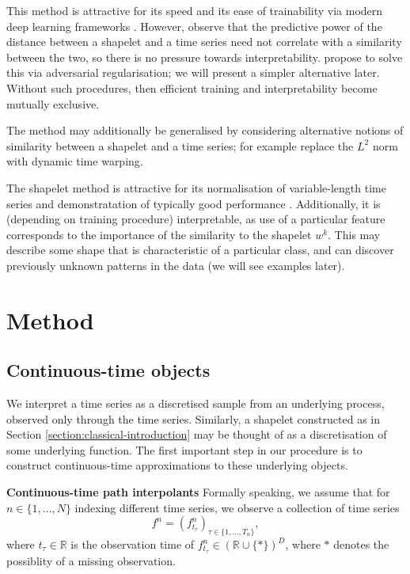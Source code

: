 \documentclass{article}
\theoremstyle{plain}
\theoremstyle{definition}
\newcommand{\reals}{\mathbb{R}}
\newcommand{\boldheading}[1]{

\textbf{#1}\quad}
\begin{document}
	This method is attractive for its speed and its ease of trainability via modern deep learning frameworks \cite{tensorflow, pytorch, jax}. However, \cite{wang2019interp} observe that the predictive power of the distance between a shapelet and a time series need not correlate with a similarity between the two, so there is no pressure towards interpretability. \cite{wang2019interp} propose to solve this via adversarial regularisation; we will present a simpler alternative later. Without such procedures, then efficient training and interpretability become mutually exclusive.
	
	The method may additionally be generalised by considering alternative notions of similarity between a shapelet and a time series; for example \cite{grabocka2016dtwshapelet} replace the $L^2$ norm with dynamic time warping.
	
	The shapelet method is attractive for its normalisation of variable-length time series and demonstratation of typically good performance \cite{bagnall2016bakeoff, bostrom2015shapelet}. Additionally, it is (depending on training procedure) interpretable, as use of a particular feature corresponds to the importance of the similarity to the shapelet $w^{k}$. This may describe some shape that is characteristic of a particular class, and can discover previously unknown patterns in the data (we will see examples later).
	
	\section{Method}
	\subsection{Continuous-time objects}
	We interpret a time series as a discretised sample from an underlying process, observed only through the time series. Similarly, a shapelet constructed as in Section \ref{section:classical-introduction} may be thought of as a discretisation of some underlying function. The first important step in our procedure is to construct continuous-time approximations to these underlying objects.
	
	\boldheading{Continuous-time path interpolants}
	Formally speaking, we assume that for $n \in \{1, \ldots, N\}$ indexing different time series, we observe a collection of time series
	\begin{equation*}
	f^n = (f^n_{t_\tau})_{\tau \in \{1, \ldots, T_n\}},
	\end{equation*}
	where $t_\tau \in \reals$ is the observation time of $f^n_{t_\tau} \in (\reals \cup \{*\})^D$, where $*$ denotes the possiblity of a missing observation.%
	
\end{document}
